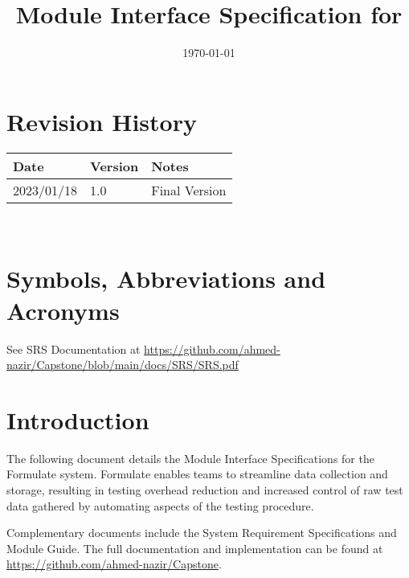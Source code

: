 \documentclass[12pt, titlepage]{article}
\begin{document}
\title{Module Interface Specification for \progname{}}

\author{\authname}

\date{\today}

\maketitle


\section{Revision History}

\begin{tabularx}{\textwidth}{p{3cm}p{2cm}X}
\toprule {\bf Date} & {\bf Version} & {\bf Notes}\\
\midrule
2023/01/18 & 1.0 & Final Version\\
\bottomrule
\end{tabularx}

~\newpage

\section{Symbols, Abbreviations and Acronyms}

See SRS Documentation at \url{https://github.com/ahmed-nazir/Capstone/blob/main/docs/SRS/SRS.pdf} 


\newpage

\tableofcontents

\newpage


\section{Introduction}

The following document details the Module Interface Specifications for the Formulate system. Formulate enables teams to streamline data collection and storage, resulting in testing overhead reduction and increased control of raw test data gathered by automating aspects of the testing procedure. \\



Complementary documents include the System Requirement Specifications
and Module Guide.  The full documentation and implementation can be
found at \url{https://github.com/ahmed-nazir/Capstone}.  
\end{document}

